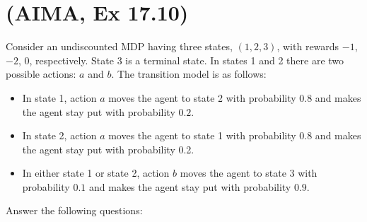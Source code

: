 \documentclass[11pt, a4paper]{article}
\begin{document}

\newpage

\section{(AIMA, Ex 17.10)}

Consider an undiscounted MDP having three states, $(1, 2, 3)$, with rewards $-1$, $-2$, $0$, respectively. State 3 is a terminal state. In states 1 and 2 there are two possible actions: $a$ and $b$. The transition model is as follows:

\begin{itemize}
    \item In state 1, action $a$ moves the agent to state 2 with probability $0.8$ and makes the agent stay put with probability $0.2$.
    \item In state 2, action $a$ moves the agent to state 1 with probability $0.8$ and makes the agent stay put with probability 0.2.
    \item In either state 1 or state 2, action $b$ moves the agent to state 3 with probability $0.1$ and makes the agent stay put with probability $0.9$.
\end{itemize}

Answer the following questions:
\end{document}
